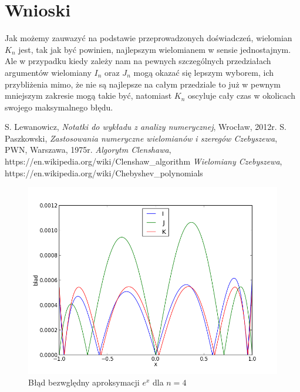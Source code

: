 \documentclass[11pt,leqno]{article}
\begin{document}
\section{Wnioski}\label{S:Wnioski}
Jak możemy zauwazyć na podstawie przeprowadzonych doświadczeń, wielomian $K_n$ jest, tak jak być powinien, najlepszym wielomianem w sensie jednostajnym. Ale w przypadku kiedy zależy nam na pewnych szczególnych przedziałach argumentów wielomiany $I_n$ oraz $J_n$ mogą okazać się lepszym wyborem, ich przybliżenia mimo, że nie są najlepsze na całym przedziale to już w pewnym mniejszym zakresie mogą takie być, natomiast $K_n$ oscyluje cały czas w okolicach swojego maksymalnego błędu.
\thispagestyle{empty}
\begin{thebibliography}{99}
     S. Lewanowicz, \textit{Notatki do wykładu z analizy numerycznej}, Wrocław, 2012r.
     S. Paszkowski, \textit{Zastosowania numeryczne wielomianów i szeregów Czebyszewa}, PWN, Warszawa, 1975r.
     \textit{Algorytm Clenshawa}, https://en.wikipedia.org/wiki/Clenshaw\_algorithm
     \textit{Wielomiany Czebyszewa}, https://en.wikipedia.org/wiki/Chebyshev\_polynomials
\end{thebibliography}
\thispagestyle{empty}
\begin{center}
    \begin{figure}[!ht]
        \begin{center}
        \includegraphics{graph0_4.png}
        \caption{Błąd bezwględny aproksymacji $e^x$ dla $n=4$}\label{G:Wykresex4}
    \end{center}
    \end{figure}
\end{center}
\end{document}
